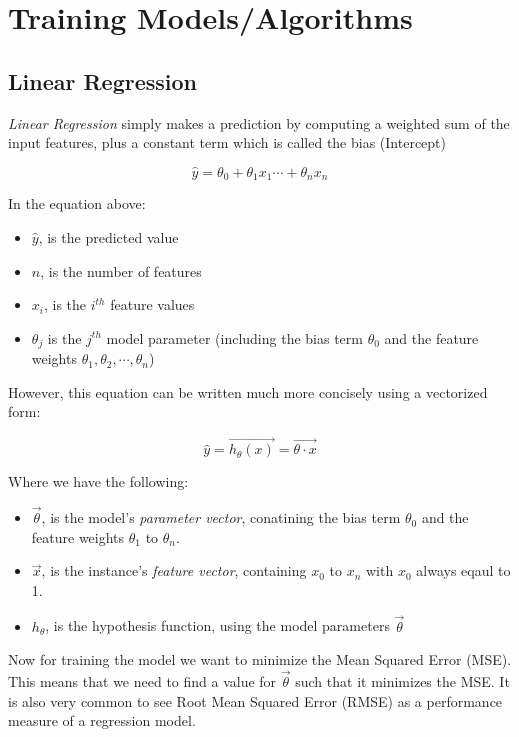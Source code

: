 \section{Training Models/Algorithms}

\subsection{Linear Regression}

\textit{Linear Regression} simply makes a prediction by computing a weighted sum of the input
features, plus a constant term which is called the bias (Intercept)

$$\hat{y} = \theta_{0} + \theta_{1}x_{1} \cdots + \theta_{n}x_{n}$$

\noindent 
In the equation above:
\begin{itemize}
    \item $\hat{y}$, is the predicted value
    \item $n$, is the number of features
    \item $x_{i}$, is the $i^{th}$ feature values
    \item $\theta_{j}$ is the $j^{th}$ model parameter (including the bias term $\theta_{0}$
    and the feature weights $\theta_{1}, \theta_{2}, \cdots, \theta_{n}$)
\end{itemize}

\noindent 
However, this equation can be written much more concisely using a vectorized form:

$$\hat{y} = \vec{h_{\theta}(x)} = \vec{\theta \cdot x}$$

\noindent 
Where we have the following:
\begin{itemize}
    \item $\vec{\theta}$, is the model's \textit{parameter vector}, conatining the bias term
          $\theta_{0}$ and the feature weights $\theta_{1}$ to $\theta_{n}$.
    \item $\vec{x}$, is the instance's \textit{feature vector}, containing $x_{0}$ to $x_{n}$
          with $x_{0}$ always eqaul to 1.
    \item $h_{\theta}$, is the hypothesis function, using the model parameters $\vec{\theta}$
\end{itemize}

\noindent
Now for training the model we want to minimize the Mean Squared Error (MSE). This
means that we need to find a value for $\vec{\theta}$ such that it minimizes the MSE. It is 
also very common to see Root Mean Squared Error (RMSE) as a performance measure of a regression
model. \\

